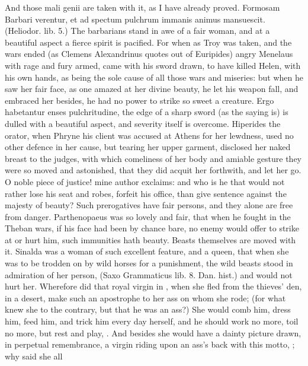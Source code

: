 And those mali genii are taken with it, as I have already proved.
Formosam Barbari verentur, et ad spectum pulchrum immanis animus
mansuescit. (Heliodor. lib. 5.) The barbarians stand in awe of a fair
woman, and at a beautiful aspect a fierce spirit is pacified. For when
as Troy was taken, and the wars ended (as Clemens Alexandrinus
quotes out of Euripides) angry Menelaus with rage and fury armed, came
with his sword drawn, to have killed Helen, with his own hands, as
being the sole cause of all those wars and miseries: but when he saw
her fair face, as one amazed at her divine beauty, he let his weapon
fall, and embraced her besides, he had no power to strike so sweet a
creature. Ergo habetantur enses pulchritudine, the edge of a sharp
sword (as the saying is) is dulled with a beautiful aspect, and
severity itself is overcome. Hiperides the orator, when Phryne his
client was accused at Athens for her lewdness, used no other defence in
her cause, but tearing her upper garment, disclosed her naked breast to
the judges, with which comeliness of her body and amiable gesture they
were so moved and astonished, that they did acquit her forthwith, and
let her go. O noble piece of justice! mine author exclaims: and who is
he that would not rather lose his seat and robes, forfeit his office,
than give sentence against the majesty of beauty? Such prerogatives
have fair persons, and they alone are free from danger. Parthenopaeus
was so lovely and fair, that when he fought in the Theban wars, if his
face had been by chance bare, no enemy would offer to strike at or hurt
him, such immunities hath beauty. Beasts themselves are moved with it.
Sinalda was a woman of such excellent feature, and a queen, that
when she was to be trodden on by wild horses for a punishment, the wild
beasts stood in admiration of her person, (Saxo Grammaticus lib. 8.
Dan. hist.) and would not hurt her. Wherefore did that royal virgin in
\Apuleius, when she fled from the thieves' den, in a desert, make
such an apostrophe to her ass on whom she rode; (for what knew she to
the contrary, but that he was an ass?)  She would comb him, dress him, feed him, and trick him
every day herself, and he should work no more, toil no more, but rest
and play, \etc{}. And besides she would have a dainty picture drawn, in
perpetual remembrance, a virgin riding upon an ass's back with this
motto, ; why said she all
